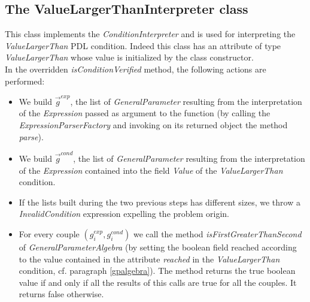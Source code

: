 \documentclass[a4paper,11pt] {ivoa}
\begin{document}
\subsection{The ValueLargerThanInterpreter class}\label{VLT}
This class implements the  {\it ConditionInterpreter} and is used for interpreting the {\it ValueLargerThan} PDL condition. Indeed this class has an attribute of type {\it ValueLargerThan} whose value is initialized by the class constructor. \\
In the overridden {\it isConditionVerified} method, the following actions are performed:
\begin{itemize}
\item We build $\vec g^{exp}$, the list of {\it GeneralParameter} resulting from the interpretation of the {\it Expression} passed as argument to the function (by calling the {\it ExpressionParserFactory} and invoking on its returned object the method {\it parse}).
\item We build $\vec g^{cond}$, the list of {\it GeneralParameter} resulting from the interpretation of the {\it Expression} contained into the field {\it Value} of the {\it ValueLargerThan} condition.
\item If the lists built during the two previous steps has different sizes, we throw a {\it InvalidCondition} expression expelling the problem origin. 
\item For every couple $(g_i^{exp}, g_i^{cond})$ we call the method  {\it isFirstGreaterThanSecond} of {\it GeneralParameterAlgebra} (by setting the boolean field reached according to the value contained in the attribute {\it reached} in the  {\it ValueLargerThan} condition, cf. paragraph \ref{gpalgebra}). The method returns the true boolean value if and only if all the results of this calls are true for all the couples. It returns false otherwise. 
\end{itemize}
\end{document}
